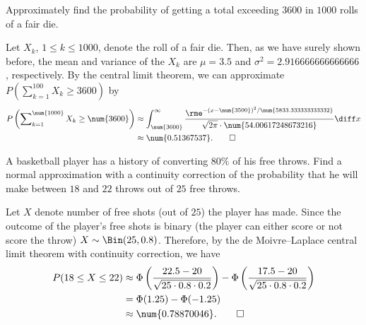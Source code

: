 \begin{problem}[Handout 14, \# 5]
  Approximately find the probability of getting a total exceeding
  \(\num{3600}\) in \(\num{1000}\) rolls of a fair die.
\end{problem}
\begin{solution}
  Let \(X_k\), \(1\leq k\leq\num{1000}\), denote the roll of a fair
  die. Then, as we have surely shown before, the mean and variance of the
  \(X_k\) are \(\mu=3.5\) and \(\sigma^2=\num{2.916666666666666}\),
  respectively. By the central limit theorem, we can approximate
  \(P(\sum_{k=1}^{100}X_k\geq\num{3600})\) by
  \begin{align*}
    P\left(\sum\nolimits_{k=1}^{\num{1000}}X_k\geq\num{3600}\right)
    &\approx\int_{\num{3600}}^\infty
      \frac{\rme^{-(x-\num{3500})^2/\num{5833.333333333332}}}
      {\sqrt{2\pi}\cdot\num{54.00617248673216}}\diff x\\
    &\approx\num{0.51367537}.\qedhere
  \end{align*}
\end{solution}
\newpage

\begin{problem}[Handout 14, \# 6]
  A basketball player has a history of converting \(80\%\) of his free
  throws. Find a normal approximation with a continuity correction of the
  probability that he will make between \(18\) and \(22\) throws out of
  \(25\) free throws.
\end{problem}
\begin{solution}
  Let \(X\) denote number of free shots (out of \(25\)) the player has
  made. Since the outcome of the player's free shots is binary (the player
  can either score or not score the throw)
  \(X\sim\Bin(25,0.8)\). Therefore, by the de Moivre--Laplace central limit
  theorem with continuity correction, we have
  \begin{align*}
    P(18\leq X\leq 22)
    &\approx\Phi\left(\frac{22.5-20}{\sqrt{25\cdot 0.8\cdot 0.2}}\right)
      -\Phi\left(\frac{17.5-20}{\sqrt{25\cdot 0.8\cdot 0.2}}\right)\\
    &=\Phi(1.25)-\Phi(-1.25)\\
    &\approx\num{0.78870046}.\qedhere
  \end{align*}
\end{solution}
\newpage

